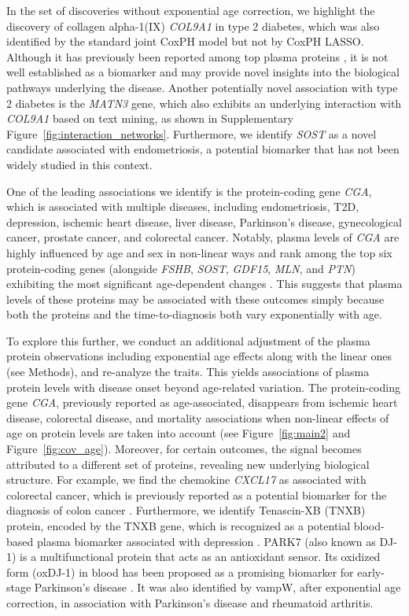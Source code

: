 In the set of discoveries without exponential age correction, we highlight the discovery of collagen alpha-1(IX) \emph{COL9A1} in type 2 diabetes, which was also identified by the standard joint CoxPH model but not by CoxPH LASSO. Although it has previously been reported among top plasma proteins \cite{deng_atlas_2025}, it is not well established as a biomarker and may provide novel insights into the biological pathways underlying the disease. Another potentially novel association with type 2 diabetes is the \emph{MATN3} gene, which also exhibits an underlying interaction with \emph{COL9A1} based on text mining, as shown in Supplementary Figure~\ref{fig:interaction_networks}. Furthermore, we identify \emph{SOST} as a novel candidate associated with endometriosis, a potential biomarker that has not been widely studied in this context.

One of the leading associations we identify is the protein-coding gene \emph{CGA}, which is associated with multiple diseases, including endometriosis, T2D, depression, ischemic heart disease, liver disease, Parkinson’s disease, gynecological cancer, prostate cancer, and colorectal cancer. Notably, plasma levels of \emph{CGA} are highly influenced by age and sex in non-linear ways and rank among the top six protein-coding genes (alongside \emph{FSHB}, \emph{SOST}, \emph{GDF15}, \emph{MLN}, and \emph{PTN}) exhibiting the most significant age-dependent changes \cite{deng_atlas_2025,Sigurdsson2025}. This suggests that plasma levels of these proteins may be associated with these outcomes simply because both the proteins and the time-to-diagnosis both vary exponentially with age. 

To explore this further, we conduct an additional adjustment of the plasma protein observations including exponential age effects along with the linear ones (see Methods), and re-analyze the traits. This yields associations of plasma protein levels with disease onset beyond age-related variation. The protein-coding gene \emph{CGA}, previously reported as age-associated, disappears from ischemic heart disease, colorectal disease, and mortality associations when non-linear effects of age on protein levels are taken into account (see Figure~\ref{fig:main2} and Figure~\ref{fig:cov_age}). Moreover, for certain outcomes, the signal becomes attributed to a different set of proteins, revealing new underlying biological structure. For example, we find the chemokine \emph{CXCL17} as associated with colorectal cancer, which is previously reported as a potential biomarker for the diagnosis of colon cancer \cite{ohlsson_ectopic_2016}. Furthermore, we identify Tenascin-XB (TNXB) protein, encoded by the TNXB gene, which is recognized as a potential blood-based plasma biomarker associated with depression \cite{biomedicines8110455}. PARK7 (also known as DJ-1) is a multifunctional protein that acts as an antioxidant sensor. Its oxidized form (oxDJ-1) in blood has been proposed as a promising biomarker for early-stage Parkinson’s disease \cite{Matsuda2024ModificationsOD}. It was also identified by vampW, after exponential age correction, in association with Parkinson’s disease and rheumatoid arthritis.

